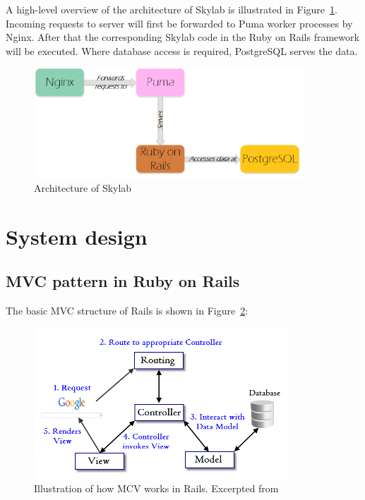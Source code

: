 A high-level overview of the architecture of Skylab is illustrated in Figure~\ref{fig:Skylabarch}. Incoming requests to server will first be forwarded to Puma worker processes by Nginx. After that the corresponding Skylab code in the Ruby on Rails framework will be executed. Where database access is required, PostgreSQL serves the data.

\begin{figure}[h]
  \centering
  \includegraphics[width=0.9\textwidth]{Images/Skylab_Arch.png}
  \caption{Architecture of Skylab}
  \label{fig:Skylabarch}
\end{figure}

\section{System design}

\subsection{MVC pattern in Ruby on Rails}

The basic MVC structure of Rails is shown in Figure~\ref{fig:RailsMVC}:

\begin{figure}[h]
  \centering
  \includegraphics[width=0.85\textwidth]{Images/Rails_MVC.png}
  \caption{Illustration of how MCV works in Rails. Excerpted from \cite{citationMVC}}
  \label{fig:RailsMVC}
\end{figure}

